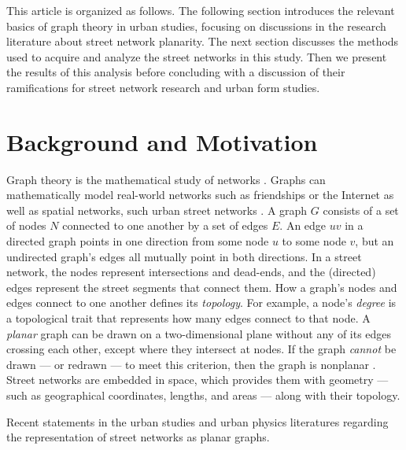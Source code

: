 \documentclass[Afour,sageh,times]{sagej}
\begin{document}
This article is organized as follows. The following section introduces the relevant basics of graph theory in urban studies, focusing on discussions in the research literature about street network planarity. The next section discusses the methods used to acquire and analyze the street networks in this study. Then we present the results of this analysis before concluding with a discussion of their ramifications for street network research and urban form studies.


\section{Background and Motivation}

Graph theory is the mathematical study of networks \citep{newman_networks:_2010}. Graphs can mathematically model real-world networks such as friendships or the Internet as well as spatial networks, such urban street networks \citep{barthelemy_spatial_2011}. A graph $G$ consists of a set of nodes $N$ connected to one another by a set of edges $E$. An edge $uv$ in a directed graph points in one direction from some node $u$ to some node $v$, but an undirected graph's edges all mutually point in both directions. In a street network, the nodes represent intersections and dead-ends, and the (directed) edges represent the street segments that connect them. How a graph's nodes and edges connect to one another defines its \emph{topology}. For example, a node's \emph{degree} is a topological trait that represents how many edges connect to that node. A \emph{planar} graph can be drawn on a two-dimensional plane without any of its edges crossing each other, except where they intersect at nodes. If the graph \emph{cannot} be drawn --- or redrawn --- to meet this criterion, then the graph is nonplanar \citep{trudeau_introduction_1994}. Street networks are embedded in space, which provides them with geometry --- such as geographical coordinates, lengths, and areas --- along with their topology.

\begin{table}[htbp]
\centering
\caption{Recent statements in the urban studies and urban physics literatures regarding the representation of street networks as planar graphs.}
\label{tab:planar_quotes}

\end{table}
\end{document}
